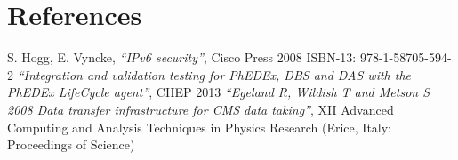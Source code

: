 \section*{References}

\begin{thebibliography}{1}
 S. Hogg, E. Vyncke,
    {\it ``IPv6 security''}, Cisco Press 2008 ISBN-13: 978-1-58705-594-2
    {\it ``Integration and validation testing for PhEDEx, DBS and DAS with the PhEDEx LifeCycle agent''}, CHEP 2013
    {\it ``Egeland R, Wildish T and Metson S 2008 Data transfer infrastructure for CMS data taking''},  XII Advanced Computing and Analysis Techniques in Physics Research (Erice, Italy: Proceedings of Science)
\end{thebibliography}
